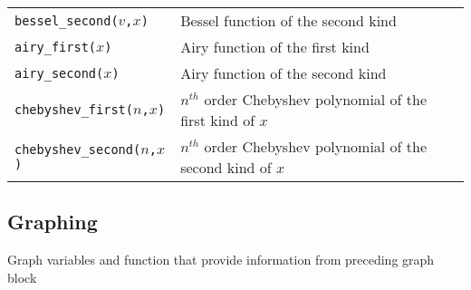 \begin{supertabular}{ll}
{\tt bessel\_second($v$,$x$)}         & Bessel function of the second kind \\
{\tt airy\_first($x$)}      	           & Airy function of the first kind \\
{\tt airy\_second($x$)}      	       & Airy function of the second kind \\
{\tt chebyshev\_first($n$,$x$)}       & $n^{th}$ order Chebyshev polynomial of the first kind of $x$  \\
{\tt chebyshev\_second($n$,$x$)}     & $n^{th}$ order Chebyshev polynomial of the second kind of $x$  \\
\end{supertabular}


\subsection{Graphing}

Graph variables and function that provide information from preceding graph block

